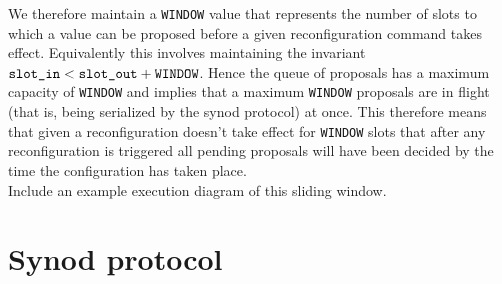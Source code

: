 We therefore maintain a \texttt{WINDOW} value that represents the number of slots to which a value can be proposed before a given reconfiguration command takes effect. Equivalently this involves maintaining the invariant $ \textrm{\texttt{slot\_in}} < \textrm{\texttt{slot\_out}} + \textrm{\texttt{WINDOW}} $. Hence the queue of proposals has a maximum capacity of \texttt{WINDOW} and implies that a maximum \texttt{WINDOW} proposals are in flight (that is, being serialized by the synod protocol) at once. This therefore means that given a reconfiguration doesn't take effect for \texttt{WINDOW} slots that after any reconfiguration is triggered all pending proposals will have been decided by the time the configuration has taken place. \\

{\color{blue}Include an example execution diagram of this sliding window}.















\section{Synod protocol}


